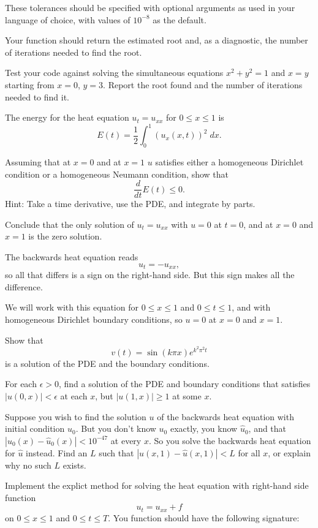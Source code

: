 \documentclass[minion]{homework}
\begin{document}
\begin{problems}
These tolerances should be specified with optional arguments 
as used in your language of choice, with values of $10^{-8}$ as the default.

Your function should return the estimated root and, as a diagnostic, the number of iterations needed to find the root.

Test your code against solving the simultaneous equations
$x^2+y^2=1$ and $x=y$ starting from $x=0$, $y=3$.  Report the root found and the number of iterations needed to find it.

\problem The energy for the heat equation $u_t=u_{xx}$ 
for $0\le x\le 1$ is
\[
E(t) = \frac{1}{2}\int_0^1 (u_x(x,t))^2\;dx.
\]
\begin{subproblems}
\item Assuming that at $x=0$ and at $x=1$ $u$ satisfies either
a homogeneous Dirichlet condition or a homogeneous Neumann condition,
show that
\[
\frac{d}{dt} E(t) \le 0.
\]
Hint: Take a time derivative, use the PDE, and integrate by parts.
\item Conclude that the only solution of $u_t=u_{xx}$ with $u=0$
at $t=0$, and at $x=0$ and $x=1$ is the zero solution.
\end{subproblems}

\problem The backwards heat equation reads
\[
u_t = -u_{xx},
\]
so all that differs is a sign on the right-hand side.  But this sign makes all the difference.

We will work with this equation for $0\le x \le 1$ and $0\le t\le 1$, and
with homogeneous Dirichlet boundary conditions, so $u=0$ at $x=0$ and $x=1$.
\begin{subproblems}
\item Show that 
\[
v(t) = \sin(k\pi x) e^{k^2\pi^2 t}
\]
is a solution of the PDE and the boundary conditions.
\item For each $\epsilon>0$, find a solution of the PDE and boundary conditions
that satisfies $|u(0,x)|<\epsilon$ at each $x$, but $|u(1,x)|\ge 1$ at some $x$.
\item Suppose you wish to find the solution $u$ of the backwards heat equation with initial condition $u_0$.  But you don't know $u_0$ exactly, you know $\hat u_0$,
and that $|u_0(x)-\hat u_0(x)|<10^{-47}$ at every $x$.  So you solve the
backwards heat equation for $\hat u$ instead.
Find an $L$ such that $|u(x,1)-\hat u(x,1)|<L$ for all $x$, or
explain why no such $L$ exists.
\end{subproblems}

\problem Implement the explict method for solving the heat equation with
right-hand side function
\[
u_t=u_{xx} + f
\]
on $0\le x \le 1$ and $0\le t\le T$.  You function should have
the following signature:


\end{problems}
\end{document}
